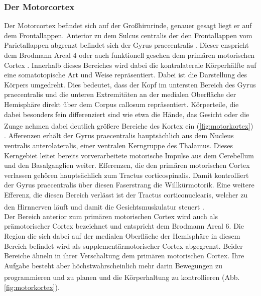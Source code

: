 \documentclass[12pt,a4paper,pdftex]{article}
\begin{document}
\subsubsection*{Der Motorcortex} 
Der Motorcortex befindet sich auf der Großhirnrinde, genauer gesagt liegt er auf dem Frontallappen. Anterior zu dem Sulcus centralis  der den Frontallappen vom Parietallappen abgrenzt befindet sich der Gyrus praecentralis . Dieser enspricht dem Brodmann Areal 4 oder auch funktionell gesehen dem primären motorischen Cortex . Innerhalb dieses Bereiches wird dabei die kontralaterale Körperhälfte auf eine somatotopische Art und Weise repräsentiert. Dabei ist die Darstellung des Körpers umgedreht. Dies bedeutet, dass der Kopf im untersten Bereich des Gyrus praecentralis und die unteren Extremitäten an der medialen Oberfläche der Hemisphäre direkt über dem Corpus callosum repräsentiert. Körperteile, die dabei besonders fein differenziert sind wie etwa die Hände, das Gesicht oder die Zunge nehmen dabei deutlich größere Bereiche des Kortex ein (\ref{fig:motorkortex}) \textsuperscript{\cite[13]{crossman2014neuroanatomy}}. Afferenzen erhält der Gyrus praecentralis hauptsächlich aus dem Nucleus ventralis anterolateralis, einer ventralen Kerngruppe des Thalamus. Dieses Kerngebiet leitet bereits vorverarbeitete motorische Impulse aus dem Cerebellum und den Basalganglien weiter. Efferenzen, die den primären motorischen Cortex verlassen gehören hauptsächlich zum Tractus corticospinalis. Damit kontrolliert der Gyrus praecentralis über diesen Faserstrang die Willkürmotorik. Eine weitere Efferenz, die diesen Bereich verlässt ist der Tractus corticonuclearis, welcher zu den Hirnnerven läuft und damit die Gesichtsmuskulatur steuert \textsuperscript{\cite[9]{trepel2011neuroanatomie}}. \\
Der Bereich anterior zum primären motorischen Cortex  wird auch als prämotorischer Cortex  bezeichnet und entspricht dem Brodmann Areal 6. Die Region die sich dabei auf der medialen Oberfläche der Hemisphäre in diesem Bereich befindet wird als supplementärmotorischer Cortex  abgegrenzt. Beider Bereiche ähneln in ihrer Verschaltung dem primären motorischen Cortex. Ihre Aufgabe besteht aber höchstwahrscheinlich mehr darin Bewegungen zu programmieren und zu planen und die Körperhaltung zu kontrollieren \textsuperscript{\cite[13]{crossman2014neuroanatomy}} (Abb. \ref{fig:motorkortex}). 
\end{document}
